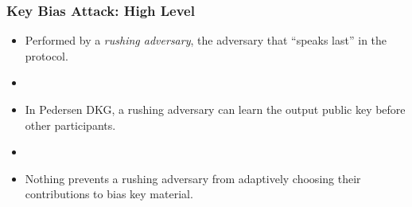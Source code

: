 \documentclass[hyperref={pdfpagelabels=true},table,dvipsnames,14pt,aspectratio=169]{beamer}
\begin{document}
\begin{frame}
  \centering
{}
\end{frame}

\begin{frame}
  \frametitle{Key Bias Attack: High Level}

  \begin{itemize}
    \item Performed by a \emph{rushing adversary}, the adversary that ``speaks last'' in the protocol.
    \item[]
    \item<2-> In Pedersen DKG, a rushing adversary can learn the output public key before other participants.
    \item[]
    \item<3-> Nothing prevents a rushing adversary from adaptively choosing their contributions to bias key material.
  \end{itemize}
\end{frame}
\end{document}

